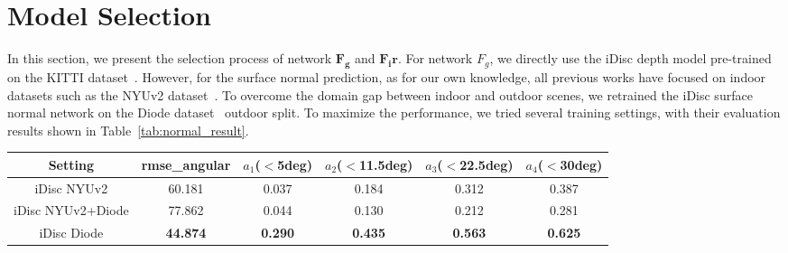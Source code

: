 \chapter{Model Selection}
\label{apd:E}

In this section, we present the selection process of network $\mathbf{F_g}$ and $\mathbf{F_ir}$. For network $F_g$, we directly use the iDisc depth model pre-trained on the KITTI dataset~\cite{Geiger2012CVPR}. However, for the surface normal prediction, as for our own knowledge, all previous works have focused on indoor datasets such as the NYUv2 dataset~\cite{Silberman:ECCV12}. To overcome the domain gap between indoor and outdoor scenes, we retrained the iDisc surface normal network on the Diode dataset~\cite{diode_dataset} outdoor split. To maximize the performance, we tried several training settings, with their evaluation results shown in Table~\ref{tab:normal_result}.

\begin{table*}[h!]
\newcolumntype{Z}{S[table-format=2.3,table-auto-round]}
\centering
\vspace{-0.5em}
\setlength{\tabcolsep}{3mm}
\small
\footnotesize
\centering
\begin{tabular}{|c|c|c|c|c|c|}\hline
Setting & rmse\_angular & $a_1$($<$5deg) & $a_2$($<$11.5deg) & $a_3$($<$22.5deg) & $a_4$($<$30deg) \\\hline
iDisc NYUv2 & 60.181 & 0.037& 0.184 & 0.312 & 0.387 \\\hline
iDisc NYUv2+Diode & 77.862 & 0.044 & 0.130 & 0.212 & 0.281 \\\hline
iDisc Diode & \textbf{44.874} & \textbf{0.290} & \textbf{0.435} & \textbf{0.563} & \textbf{0.625} \\\hline
           
\end{tabular}
\caption{{\bf iDisc normal estimation retrain result}. We present three different settings of our networks and their corresponding evaluation result.}
\label{tab:normal_result}
\end{table*}
